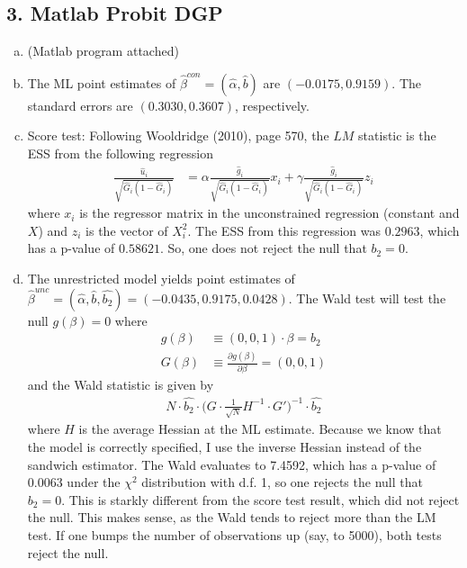 \documentclass[11pt]{article}
\begin{document}
\subsection*{3. Matlab Probit DGP}

\begin{enumerate}[a)]

	\item (Matlab program attached)

	\item The ML point estimates of $\hat{\beta}^{con} = (\hat{\alpha},\hat{b})$ are $(-0.0175,0.9159)$. The standard errors are $(0.3030,0.3607)$, respectively.

	\item Score test: Following Wooldridge (2010), page 570, the $LM$ statistic is the ESS from the following regression
	\begin{align*}
		\frac{\hat{u}_i}{\sqrt{\hat{G}_i (1 - \hat{G}_i)}} &= \alpha \frac{\hat{g}_i}{\sqrt{\hat{G}_i(1 - \hat{G}_i)}} x_i + \gamma  \frac{\hat{g}_i}{\sqrt{\hat{G}_i(1 - \hat{G}_i)}} z_i
	\end{align*}
	where $x_i$ is the regressor matrix in the unconstrained regression (constant and $X$) and $z_i$ is the vector of $X_i^2$. The ESS from this regression was $0.2963$, which has a p-value of $0.58621$. So, one does not reject the null that $b_2 = 0$.

	\item The unrestricted model yields point estimates of $\hat{\beta}^{unc} = (\hat{\alpha},\hat{b},\hat{b_2}) = (-0.0435, 0.9175, 0.0428)$. The Wald test will test the null $g(\beta) = 0$ where
	\begin{align*}
		g(\beta) &\equiv (0, 0, 1) \cdot \beta = b_2 \\
		G(\beta) &\equiv \frac{\partial g(\beta)}{\partial \beta} = (0, 0, 1)
	\end{align*}
	and the Wald statistic is given by
	\begin{align*}
		N \cdot \hat{b_2} \cdot \bigg( G \cdot \frac{1}{\sqrt{N}}H^{-1} \cdot G' \bigg)^{-1} \cdot \hat{b_2}
	\end{align*}
	where $H$ is the average Hessian at the ML estimate. Because we know that the model is correctly specified, I use the inverse Hessian instead of the sandwich estimator. The Wald evaluates to 7.4592, which has a p-value of $0.0063$ under the $\chi^2$ distribution with d.f. 1, so one rejects the null that $b_2 = 0$. This is starkly different from the score test result, which did not reject the null. This makes sense, as the Wald tends to reject more than the LM test. If one bumps the number of observations up (say, to 5000), both tests reject the null.

\end{enumerate}
\end{document}
